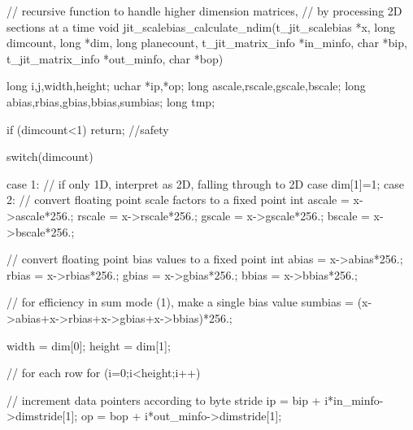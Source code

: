 \begin{DoxyCode}
// recursive function to handle higher dimension matrices,
// by processing 2D sections at a time 
void jit_scalebias_calculate_ndim(t_jit_scalebias *x, 
   long dimcount, long *dim, long planecount, 
   t_jit_matrix_info *in_minfo, char *bip, 
   t_jit_matrix_info *out_minfo, char *bop)
{
   long i,j,width,height;
   uchar *ip,*op;
   long ascale,rscale,gscale,bscale;
   long abias,rbias,gbias,bbias,sumbias;
   long tmp;
      
   if (dimcount<1) return; //safety
   
   switch(dimcount) 
   {
   case 1:   
      // if only 1D, interpret as 2D, falling through to 2D case 
      dim[1]=1;
   case 2:
      // convert floating point scale factors to a fixed point int
      ascale = x->ascale*256.;   
      rscale = x->rscale*256.;   
      gscale = x->gscale*256.;   
      bscale = x->bscale*256.;   

      // convert floating point bias values to a fixed point int
      abias  = x->abias*256.;   
      rbias  = x->rbias*256.;   
      gbias  = x->gbias*256.;   
      bbias  = x->bbias*256.;   

      // for efficiency in sum mode (1), make a single bias value
      sumbias = (x->abias+x->rbias+x->gbias+x->bbias)*256.;
            
      width  = dim[0];
      height = dim[1];
      
      // for each row
      for (i=0;i<height;i++)
      {
         // increment data pointers according to byte stride 
         ip = bip + i*in_minfo->dimstride[1];
         op = bop + i*out_minfo->dimstride[1];
         
}}}
\end{DoxyCode}
